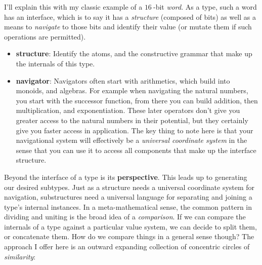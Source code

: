 \documentclass[twoside]{article}
\begin{document}
I'll explain this with my classic example of a $ 16\ \!\! $-bit \emph{word}. As a type, such a word has an interface,
which is to say it has a \emph{structure} (composed of bits) as well as a means to \emph{navigate} to those bits
and identify their value (or mutate them if such operations are permitted).

\begin{itemize}
\item {\bf structure}:	Identify the atoms, and the constructive grammar that make up the internals of this type.
\item {\bf navigator}:	Navigators often start with arithmetics, which build into monoids, and algebras. For example
			when navigating the natural numbers, you start with the successor function, from there
			you can build addition, then multiplication, and exponentiation. These later operators
			don't give you greater access to the natural numbers in their potential, but they certainly
			give you faster access in application. The key thing to note here is that your navigational
			system will effectively be a \emph{universal coordinate system} in the sense that you can use
			it to access all components that make up the interface structure.
\end{itemize}

Beyond the interface of a type is its {\bf perspective}. This leads up to generating our desired subtypes.
Just as a structure needs a universal coordinate system for navigation, substructures need a universal language
for separating and joining a type's internal instances. In a meta-mathematical sense, the common pattern in dividing
and uniting is the broad idea of a \emph{comparison}. If we can compare the internals of a type against a particular
value system, we can decide to split them, or concatenate them. How do we compare things in a general sense though?
The approach I offer here is an outward expanding collection of concentric circles of \emph{similarity}:
\end{document}
